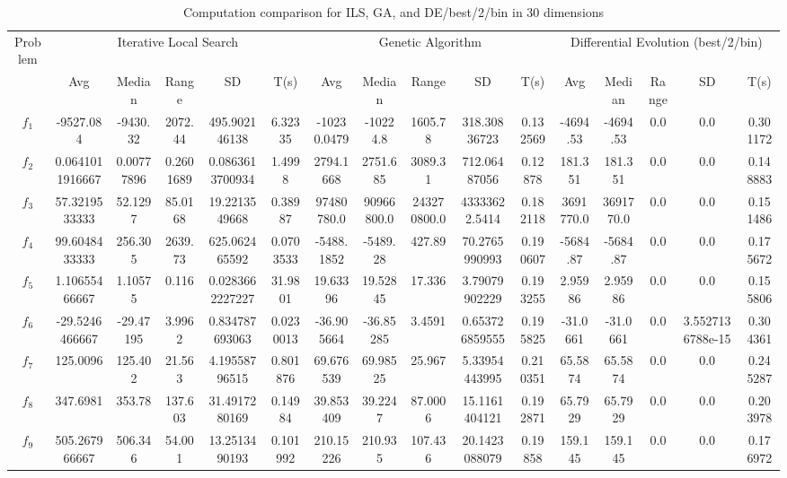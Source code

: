\documentclass[paper=a4, fontsize=11pt]{scrartcl} %
\numberwithin{equation}{section} %
\numberwithin{figure}{section} %
\numberwithin{table}{section} %
\begin{document}
\begin{landscape}
	\begin{table}
		\tiny
		\centering
		\caption{Computation comparison for ILS, GA, and DE/best/2/bin in 30 dimensions}
		\label{Tab1d}
		\begin{tabular}{c|ccccc|ccccc|ccccc}
			\noalign{\smallskip}\hline\noalign{\smallskip}
			Problem & \multicolumn{5}{c}{Iterative Local Search}& \multicolumn{5}{|c|}{Genetic Algorithm}
			&  \multicolumn{5}{c}{Differential Evolution (best/2/bin)} \\ 
			\noalign{\smallskip}\hline\noalign{\smallskip}
			& Avg & Median & Range & SD & T(s) & Avg & Median
			& Range & SD & T(s) & Avg & Median & Range & SD &
			T(s) \\ 
			\noalign{\smallskip}\hline\noalign{\smallskip}
			$f_{1}$ & -9527.084 & -9430.32 & 2072.44 & 495.902146138 & 6.32335 & -10230.0479 & -10224.8 & 1605.78 & 318.30836723 & 0.132569 & -4694.53 & -4694.53 & 0.0 & 0.0 & 0.301172\\
			$f_{2}$ & 0.0641011916667 & 0.00777896 & 0.2601689 & 0.0863613700934 & 1.4998 & 2794.1668 & 2751.685 & 3089.31 & 712.06487056 & 0.12878 & 181.351 & 181.351 & 0.0 & 0.0 & 0.148883\\
			$f_{3}$ & 57.3219533333 & 52.1297 & 85.0168 & 19.2213549668 & 0.38987 & 97480780.0 & 90966800.0 & 243270800.0 & 43333622.5414 & 0.182118 & 3691770.0 & 3691770.0 & 0.0 & 0.0 & 0.151486\\
			$f_{4}$ & 99.6048433333 & 256.305 & 2639.73 & 625.062465592 & 0.0703533 & -5488.1852 & -5489.28 & 427.89 & 70.2765990993 & 0.190607 & -5684.87 & -5684.87 & 0.0 & 0.0 & 0.175672\\
			$f_{5}$ & 1.10655466667 & 1.10575 & 0.116 & 0.0283662227227 & 31.9801 & 19.63396 & 19.52845 & 17.336 & 3.79079902229 & 0.193255 & 2.95986 & 2.95986 & 0.0 & 0.0 & 0.155806\\
			$f_{6}$ & -29.5246466667 & -29.47195 & 3.9962 & 0.834787693063 & 0.0230013 & -36.905664 & -36.85285 & 3.4591 & 0.653726859555 & 0.195825 & -31.0661 & -31.0661 & 0.0 & 3.5527136788e-15 & 0.304361\\
			$f_{7}$ & 125.0096 & 125.402 & 21.563 & 4.19558796515 & 0.801876 & 69.676539 & 69.98525 & 25.967 & 5.33954443995 & 0.210351 & 65.5874 & 65.5874 & 0.0 & 0.0 & 0.245287\\
			$f_{8}$ & 347.6981 & 353.78 & 137.603 & 31.4917280169 & 0.14984 & 39.853409 & 39.2247 & 87.0006 & 15.1161404121 & 0.192871 & 65.7929 & 65.7929 & 0.0 & 0.0 & 0.203978\\
			$f_{9}$ & 505.267966667 & 506.346 & 54.001 & 13.2513490193 & 0.101992 & 210.15226 & 210.935 & 107.436 & 20.1423088079 & 0.19858 & 159.145 & 159.145 & 0.0 & 0.0 & 0.176972\\

\end{tabular}
\end{table}
\end{landscape}
\end{document}
